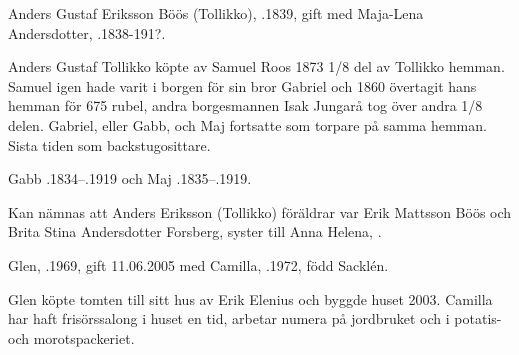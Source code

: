 Anders Gustaf Eriksson Böös (Tollikko), .1839, gift med Maja-Lena Andersdotter, .1838-191?.
\begin{jhchildren}
  \item {}
  \item {}
  \item {}
  \item {}
\end{jhchildren}
Anders Gustaf Tollikko köpte av Samuel Roos 1873 1/8 del av Tollikko 	hemman. Samuel igen hade varit i borgen för sin bror Gabriel och 1860 övertagit hans hemman för 675 rubel, andra borgesmannen Isak Jungarå tog över andra 1/8 delen. Gabriel, eller Gabb, och Maj fortsatte som torpare på samma hemman. Sista tiden som backstugosittare.

Gabb .1834--.1919 och Maj .1835--.1919.

Kan nämnas att Anders Eriksson (Tollikko) föräldrar var Erik	Mattsson Böös och Brita Stina Andersdotter Forsberg, syster till Anna Helena, .






Glen, .1969, gift 11.06.2005 med Camilla, .1972, född Sacklén.
\begin{jhchildren}
  \item {}
  \item {}
  \item {}
\end{jhchildren}

Glen köpte tomten till sitt hus av Erik Elenius och byggde huset 2003. Camilla har haft frisörssalong i huset en tid, arbetar numera på jordbruket och i potatis- och morotspackeriet.

